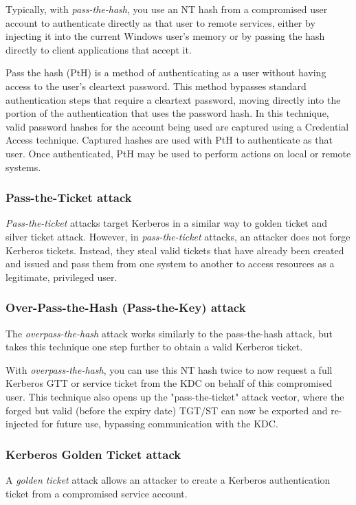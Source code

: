 Typically, with \textit{pass-the-hash}, you use an NT hash from a compromised user account to authenticate directly as that user to remote services, either by injecting it into the current Windows user's memory or by passing the hash directly to client applications that accept it.

Pass the hash (PtH) is a method of authenticating as a user without having access to the user's cleartext password. This method bypasses standard authentication steps that require a cleartext password, moving directly into the portion of the authentication that uses the password hash. In this technique, valid password hashes for the account being used are captured using a Credential Access technique. Captured hashes are used with PtH to authenticate as that user. Once authenticated, PtH may be used to perform actions on local or remote systems.

\subsubsection{Pass-the-Ticket attack}
\textit{Pass-the-ticket} attacks target Kerberos in a similar way to golden ticket and silver ticket attack. However, in \textit{pass-the-ticket} attacks, an attacker does not forge Kerberos tickets. Instead, they steal valid tickets that have already been created and issued and pass them from one system to another to access resources as a legitimate, privileged user.

\subsubsection{Over-Pass-the-Hash (Pass-the-Key) attack}
The \textit{overpass-the-hash} attack works similarly to the pass-the-hash attack, but takes this technique one step further to obtain a valid Kerberos ticket.

With \textit{overpass-the-hash}, you can use this NT hash twice to now request a full Kerberos GTT or service ticket from the KDC on behalf of this compromised user. This technique also opens up the "pass-the-ticket" attack vector, where the forged but valid (before the expiry date) TGT/ST can now be exported and re-injected for future use, bypassing communication with the KDC.

\subsubsection{Kerberos Golden Ticket attack}
A \textit{golden ticket} attack allows an attacker to create a Kerberos authentication ticket from a compromised service account.


